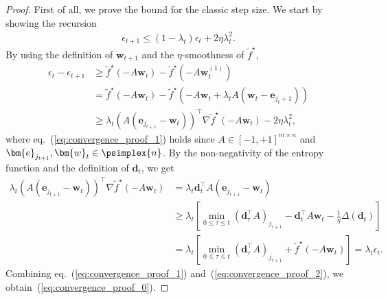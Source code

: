 \begin{proof}
    First of all, we prove the bound for the classic step size. 
    We start by showing the recursion 
    \begin{align}
        \label{eq:convergence_proof_0}
        \epsilon_{t+1}
        \leq (1 - \lambda_t) \epsilon_t + 2 \eta \lambda_t^2.
    \end{align}
    By using the definition of $\bm{w}_{t+1}$ 
    and the $\eta$-smoothness of $\tilde{f}^\star$, 
    \begin{align}
        \epsilon_t - \epsilon_{t+1}
            & \geq \tilde{f}^\star ( -A \bm{w}_t )
                - \tilde{f}^\star ( -A \bm{w}_t^{(1)} ) \nonumber \\
            & = \tilde{f}^\star ( -A \bm{w}_t )
                - \tilde{f}^\star (
                    -A \bm{w}_t + \lambda_t A(\bm{w}_t - \bm{e}_{{j_t+1}})
                ) \nonumber \\
            \label{eq:convergence_proof_1}
            & \geq \lambda_t ( A (\bm{e}_{j_{t+1}} - \bm{w}_{t}) )^\top
                \nabla \tilde{f}^\star (- A \bm{w}_t) - 2\eta \lambda_t^2,
    \end{align}
    where eq.~(\ref{eq:convergence_proof_1}) holds since 
    $A \in [-1, +1]^{m \times n}$ 
    and $\bm{e}_{j_{t+1}}, \bm{w}_t \in \psimplex{n}$. 
    By the non-negativity of the entropy function 
    and the definition of $\bm{d}_t$, we get
    \begin{align}
            \lambda_t ( A (\bm{e}_{j_{t+1}} - \bm{w}_{t}) )^\top
                \nabla \tilde{f}^\star (- A \bm{w}_t)
            & = \lambda_t \bm{d}_t^\top A (\bm{e}_{j_{t+1}} - \bm{w}_{t})
                \nonumber \\
            & \geq \lambda_t
                \left[
                    \min_{0 \leq \tau \leq t} 
                    (\bm{d}_\tau^\top A)_{j_{\tau + 1}} 
                    - \bm{d}_{t}^\top A \bm{w}_t 
                    - \frac{1}{\eta} \Delta (\bm{d}_t)
                \right]
                \nonumber \\
            \label{eq:convergence_proof_2}
            & = \lambda_t
                \left[
                    \min_{0 \leq \tau \leq t} 
                    (\bm{d}_\tau^\top A)_{j_{\tau + 1}} 
                    + \tilde{f}^\star( - A\bm{w}_t )
                \right]
            = \lambda_t \epsilon_t.
    \end{align}
    Combining eq.~(\ref{eq:convergence_proof_1}) 
    and~(\ref{eq:convergence_proof_2}), 
    we obtain~(\ref{eq:convergence_proof_0}). 


\end{proof}
